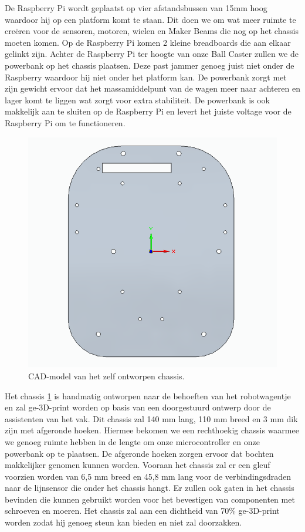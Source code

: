 \documentclass[a4paper,kulak]{kulakarticle}
\begin{document}
De Raspberry Pi wordt geplaatst op vier afstandsbussen van 15mm hoog waardoor hij op een platform komt te staan. Dit doen we om wat meer ruimte te creëren voor de sensoren, motoren, wielen en Maker Beams die nog op het chassis moeten komen. Op de Raspberry Pi komen 2  kleine breadboards die aan elkaar gelinkt zijn. Achter de Raspberry Pi ter hoogte van onze Ball Caster zullen we de powerbank op het chassis plaatsen. Deze past jammer genoeg juist niet onder de Raspberry waardoor hij niet onder het platform kan. De powerbank zorgt met zijn gewicht ervoor dat het massamiddelpunt van de wagen meer naar achteren en lager komt te liggen wat zorgt voor extra stabiliteit. De powerbank is ook makkelijk aan te sluiten op de Raspberry Pi en levert het juiste voltage voor de Raspberry Pi om te functioneren. 

\begin{figure}[h]
	\centering
	\includegraphics[width=.5\textwidth] {chassis3d}
	\caption{CAD-model van het zelf ontworpen chassis.}
	\label{fig:chassis}
\end{figure}

Het chassis \ref{fig:chassis} is handmatig ontworpen naar de behoeften van het robotwagentje en zal ge-3D-print worden op basis van een doorgestuurd ontwerp door de assistenten van het vak. Dit chassis zal 140 mm lang, 110 mm breed en 3 mm dik zijn met afgeronde hoeken. Hiermee bekomen we een rechthoekig chassis waarmee we genoeg ruimte hebben in de lengte om onze microcontroller en onze powerbank op te plaatsen. De afgeronde hoeken zorgen ervoor dat bochten makkelijker genomen kunnen worden. Vooraan het chassis zal er een gleuf voorzien worden van 6,5 mm breed en 45,8 mm lang voor de verbindingsdraden naar de lijnsensor die onder het chassis hangt. Er zullen ook gaten in het chassis bevinden die kunnen gebruikt worden voor het bevestigen van componenten met schroeven en moeren. Het chassis zal aan een dichtheid van 70\% ge-3D-print worden zodat hij genoeg steun kan bieden en niet zal doorzakken.
\end{document}
